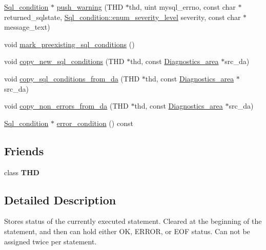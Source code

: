 \begin{DoxyCompactItemize}
\item 
\mbox{\hyperlink{classSql__condition}{Sql\+\_\+condition}} $\ast$ \mbox{\hyperlink{classDiagnostics__area_a19c274a315f6a7f9c40618befd62d530}{push\+\_\+warning}} (T\+HD $\ast$thd, uint mysql\+\_\+errno, const char $\ast$returned\+\_\+sqlstate, \mbox{\hyperlink{classSql__condition_ab0602581e19cddb609bfe10c44be4e83}{Sql\+\_\+condition\+::enum\+\_\+severity\+\_\+level}} severity, const char $\ast$message\+\_\+text)
\item 
void \mbox{\hyperlink{classDiagnostics__area_a49941326d0fd428be3f52eb3349419ca}{mark\+\_\+preexisting\+\_\+sql\+\_\+conditions}} ()
\item 
void \mbox{\hyperlink{classDiagnostics__area_a8ba22c7357c66a3672791b84fe836b18}{copy\+\_\+new\+\_\+sql\+\_\+conditions}} (T\+HD $\ast$thd, const \mbox{\hyperlink{classDiagnostics__area}{Diagnostics\+\_\+area}} $\ast$src\+\_\+da)
\item 
void \mbox{\hyperlink{classDiagnostics__area_abe64d1bc735a09bc3e29bec271b9face}{copy\+\_\+sql\+\_\+conditions\+\_\+from\+\_\+da}} (T\+HD $\ast$thd, const \mbox{\hyperlink{classDiagnostics__area}{Diagnostics\+\_\+area}} $\ast$src\+\_\+da)
\item 
void \mbox{\hyperlink{classDiagnostics__area_a8d2b08ea1b04ca4f486c3bc6b0a341bd}{copy\+\_\+non\+\_\+errors\+\_\+from\+\_\+da}} (T\+HD $\ast$thd, const \mbox{\hyperlink{classDiagnostics__area}{Diagnostics\+\_\+area}} $\ast$src\+\_\+da)
\item 
\mbox{\hyperlink{classSql__condition}{Sql\+\_\+condition}} $\ast$ \mbox{\hyperlink{classDiagnostics__area_ab70c51196734cb073962ca88bc1d9377}{error\+\_\+condition}} () const
\end{DoxyCompactItemize}
\subsection*{Friends}
\begin{DoxyCompactItemize}
\item 
\mbox{\label{classDiagnostics__area_a786121acb870730886bdd44c874c0c57}} 
class {\bfseries T\+HD}
\end{DoxyCompactItemize}


\subsection{Detailed Description}
Stores status of the currently executed statement. Cleared at the beginning of the statement, and then can hold either OK, E\+R\+R\+OR, or E\+OF status. Can not be assigned twice per statement. 

